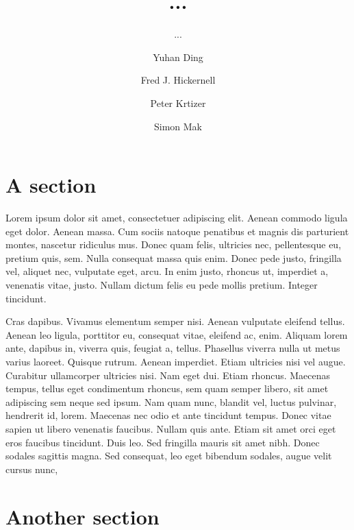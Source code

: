 \documentclass[USenglish]{article}
\begin{document}

  \author*[1]{Yuhan Ding}
  \author[2]{Fred J. Hickernell}
  \author[3]{Peter Krtizer} 
  \author[4]{Simon Mak}
  \title{...}
  \subtitle{...}
  \dedication{...}
  \aop

\maketitle

\section{A section} 

Lorem ipsum dolor sit amet, consectetuer adipiscing elit. Aenean commodo ligula eget dolor. Aenean
  massa. Cum sociis natoque penatibus et magnis dis parturient montes, nascetur ridiculus mus. Donec
  quam felis, ultricies nec, pellentesque eu, pretium quis, sem. Nulla consequat massa quis
  enim. Donec pede justo, fringilla vel, aliquet nec, vulputate eget, arcu. In enim justo, rhoncus
  ut, imperdiet a, venenatis vitae, justo. Nullam dictum felis eu pede mollis pretium. Integer
  tincidunt.

  Cras dapibus. Vivamus elementum semper nisi. Aenean vulputate eleifend tellus. Aenean
  leo ligula, porttitor eu, consequat vitae, eleifend ac, enim. Aliquam lorem ante, dapibus in,
  viverra quis, feugiat a, tellus. Phasellus viverra nulla ut metus varius laoreet. Quisque
  rutrum. Aenean imperdiet. Etiam ultricies nisi vel augue. Curabitur ullamcorper ultricies
  nisi. Nam eget dui. Etiam rhoncus. Maecenas tempus, tellus eget condimentum rhoncus, sem quam
  semper libero, sit amet adipiscing sem neque sed ipsum. Nam quam nunc, blandit vel, luctus
  pulvinar, hendrerit id, lorem. Maecenas nec odio et ante tincidunt tempus. Donec vitae sapien ut
  libero venenatis faucibus. Nullam quis ante. Etiam sit amet orci eget eros faucibus
  tincidunt. Duis leo. Sed fringilla mauris sit amet nibh. Donec sodales sagittis magna. Sed
  consequat, leo eget bibendum sodales, augue velit cursus nunc,

\section{Another section} 
\end{document}
